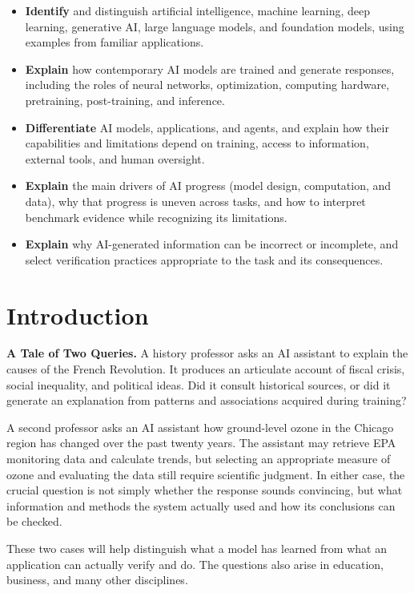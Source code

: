 \documentclass[11pt]{article}
\begin{document}
\begin{itemize}
\item\textbf{Identify} and distinguish artificial intelligence, machine learning, deep learning, generative AI, large language models, and foundation models, using examples from familiar applications.
\item\textbf{Explain}
how contemporary AI models are trained and generate responses, including the roles of neural networks, optimization, computing hardware, pretraining, post-training, and inference.
\item\textbf{Differentiate}
  AI models, applications, and agents, and explain how their capabilities and limitations depend on training, access to information, external tools, and human oversight.
\item\textbf{Explain}
the main drivers of AI progress (model design, computation, and data), why that progress is uneven across tasks, and how to interpret benchmark evidence while recognizing its limitations.
\item\textbf{Explain} why AI-generated information can be incorrect or incomplete, and select verification practices appropriate to the task and its consequences.
\end{itemize}

\clearpage

\section*{Introduction}

\noindent\textbf{A Tale of Two Queries.}
A history professor asks an AI assistant to explain the causes of the
French Revolution. It produces an articulate account of fiscal crisis,
social inequality, and political ideas. Did it consult historical sources,
or did it generate an explanation from patterns and associations acquired during training?

A second professor asks an AI assistant how ground-level ozone in the Chicago region
has changed over the past twenty years.
The assistant may retrieve EPA monitoring data and calculate trends, but selecting an appropriate measure of ozone and evaluating the data still require scientific judgment. In either case, the crucial question is not simply whether the response sounds convincing, but what information and methods the system actually used and how its conclusions can be checked.

These two cases will help distinguish what a model has learned from
what an application can actually verify and do. The questions also
arise in education, business, and many other disciplines.
\end{document}
